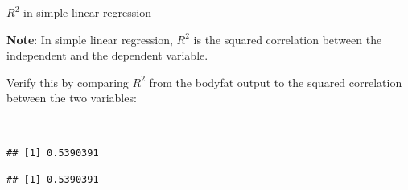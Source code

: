 \documentclass[
  10pt,
  ignorenonframetext,
]{beamer}
\newenvironment{Shaded}{\begin{snugshade}}{\end{snugshade}}
\newcommand{\DecValTok}[1]{\textcolor[rgb]{0.00,0.00,0.81}{#1}}
\newcommand{\FunctionTok}[1]{\textcolor[rgb]{0.13,0.29,0.53}{\textbf{#1}}}
\newcommand{\NormalTok}[1]{#1}
\newcommand{\SpecialCharTok}[1]{\textcolor[rgb]{0.81,0.36,0.00}{\textbf{#1}}}
\begin{document}
\begin{frame}[fragile]
\begin{block}{\(R^2\) in simple linear regression}
\protect\hypertarget{r2-in-simple-linear-regression}{}
\vspace{3mm}

\textbf{Note}: In simple linear regression, \(R^2\) is the squared
correlation between the independent and the dependent variable.

\vspace{6mm}

Verify this by comparing \(R^2\) from the bodyfat output to the squared
correlation between the two variables:

\(~\)

\scriptsize

\begin{Shaded}
\end{Shaded}

\begin{verbatim}
## [1] 0.5390391
\end{verbatim}

\begin{Shaded}
\end{Shaded}

\begin{verbatim}
## [1] 0.5390391
\end{verbatim}
\end{block}
\end{frame}
\end{document}
